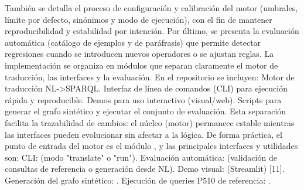 {}También se detalla el proceso de configuración y calibración del motor (umbrales, límite por defecto, sinónimos y modo de ejecución), con el fin de mantener reproducibilidad y estabilidad por intención. Por último, se presenta la evaluación automática (catálogo de ejemplos y  de paráfrasis) que permite detectar regresiones cuando se introducen nuevos operadores o se ajustan reglas.\markdownRendererInterblockSeparator
{}\markdownRendererInterblockSeparator
{}La implementación se organiza en módulos que separan claramente el motor de traducción, las interfaces y la evaluación. En el repositorio se incluyen:\markdownRendererInterblockSeparator
{}\markdownRendererUlBeginTight
\markdownRendererUlItem Motor de traducción NL->SPARQL.\markdownRendererUlItemEnd 
\markdownRendererUlItem Interfaz de línea de comandos (CLI) para ejecución rápida y reproducible.\markdownRendererUlItemEnd 
\markdownRendererUlItem Demos para uso interactivo (visual/web).\markdownRendererUlItemEnd 
\markdownRendererUlItem Scripts para generar el grafo sintético y ejecutar el conjunto de evaluación.\markdownRendererUlItemEnd 
\markdownRendererUlEndTight \markdownRendererInterblockSeparator
{}Esta separación facilita la trazabilidad de cambios: el núcleo (motor) permanece estable mientras las interfaces pueden evolucionar sin afectar a la lógica.\markdownRendererInterblockSeparator
{}De forma práctica, el punto de entrada del motor es el módulo , y las principales interfaces y utilidades son:\markdownRendererInterblockSeparator
{}\markdownRendererUlBeginTight
\markdownRendererUlItem CLI:  (modo "translate" o "run").\markdownRendererUlItemEnd 
\markdownRendererUlItem Evaluación automática:  (validación de consultas de referencia o generación desde NL).\markdownRendererUlItemEnd 
\markdownRendererUlItem Demo visual:  (Streamlit) [11].\markdownRendererUlItemEnd 
\markdownRendererUlItem Generación del grafo sintético: .\markdownRendererUlItemEnd 
\markdownRendererUlItem Ejecución de queries P510 de referencia: .\markdownRendererUlItemEnd 

